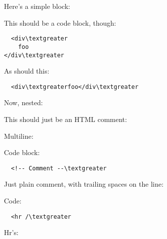 Here's a simple block:

This should be a code block, though:
\begin{verbatim}
  <div\textgreater
    foo
</div\textgreater
\end{verbatim}

As should this:
\begin{verbatim}
  <div\textgreaterfoo</div\textgreater
\end{verbatim}

Now, nested:

This should just be an HTML comment:

Multiline:

Code block:
\begin{verbatim}
  <!-- Comment --\textgreater
\end{verbatim}

Just plain comment, with trailing spaces on the line:

Code:
\begin{verbatim}
  <hr /\textgreater
\end{verbatim}

Hr's: